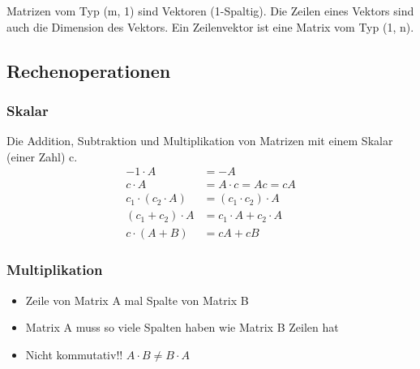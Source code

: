 \documentclass[german]{latex4ei/latex4ei_sheet}
\begin{document}
\begin{sectionbox}
Matrizen vom Typ (m, 1) sind Vektoren (1-Spaltig). Die Zeilen eines Vektors sind auch die Dimension des Vektors. Ein Zeilenvektor ist eine Matrix vom Typ (1, n).

\subsection{Rechenoperationen}
\subsubsection{Skalar}
Die Addition, Subtraktion und Multiplikation von Matrizen mit einem Skalar (einer Zahl) c.
\begin{align*}
-1 \cdot A &= -A \\ 
c \cdot A &= A \cdot c = Ac = cA \\
{c}_{1} \cdot \left( {c}_{2} \cdot A \right) &= \left( {c}_{1} \cdot {c}_{2} \right) \cdot A \\\left({c}_{1} + {c}_{2} \right) \cdot A &= {c}_{1} \cdot A + {c}_{2} \cdot A \\
c \cdot \left(A + B \right) &= cA + cB 
\end{align*}

\subsubsection{Multiplikation}
\begin{itemize}
\item Zeile von Matrix A mal Spalte von Matrix B 
\item Matrix A muss so viele Spalten haben wie Matrix B Zeilen hat 
\item Nicht kommutativ!! $A \cdot B \neq B \cdot A$
\end{itemize}

\end{sectionbox}
\end{document}
